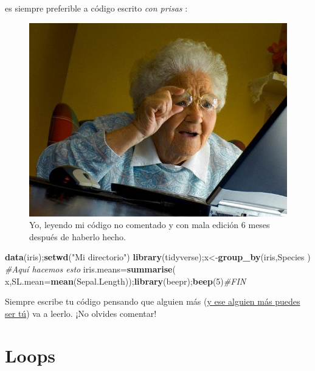 \documentclass[
]{book}
\newenvironment{Shaded}{\begin{snugshade}}{\end{snugshade}}
\newcommand{\CommentTok}[1]{\textcolor[rgb]{0.56,0.35,0.01}{\textit{#1}}}
\newcommand{\DataTypeTok}[1]{\textcolor[rgb]{0.13,0.29,0.53}{#1}}
\newcommand{\DecValTok}[1]{\textcolor[rgb]{0.00,0.00,0.81}{#1}}
\newcommand{\KeywordTok}[1]{\textcolor[rgb]{0.13,0.29,0.53}{\textbf{#1}}}
\newcommand{\NormalTok}[1]{#1}
\newcommand{\StringTok}[1]{\textcolor[rgb]{0.31,0.60,0.02}{#1}}
\begin{document}
es siempre preferible a código escrito \emph{con prisas} :

\begin{figure}

{\centering \includegraphics[width=8.89in]{images/Grandma-Finds-The-Internet} 

}

\caption{Yo, leyendo mi código no comentado y con mala edición 6 meses después de haberlo hecho.}\label{fig:unnamed-chunk-107}
\end{figure}

\begin{Shaded}
\begin{Highlighting}[]
\KeywordTok{data}\NormalTok{(iris);}\KeywordTok{setwd}\NormalTok{(}\StringTok{"Mi directorio"}\NormalTok{)}
\KeywordTok{library}\NormalTok{(tidyverse);x<-}\KeywordTok{group_by}\NormalTok{(iris,Species  )}
\CommentTok{#Aquí hacemos esto}
\NormalTok{iris.means=}\KeywordTok{summarise}\NormalTok{( x,}\DataTypeTok{SL.mean=}\KeywordTok{mean}\NormalTok{(Sepal.Length));}\KeywordTok{library}\NormalTok{(beepr);}\KeywordTok{beep}\NormalTok{(}\DecValTok{5}\NormalTok{)}\CommentTok{#FIN}
\end{Highlighting}
\end{Shaded}

Siempre escribe tu código pensando que alguien más (\href{https://www.redaccionmedica.com/virico/noticias/el-gato-de-schrodinger-y-por-que-no-abrir-la-puerta-cerrada-de-la-consulta-5188}{y ese alguien más puedes ser tú}) va a leerlo. ¡No olvides comentar!

\hypertarget{loops}{%
\section{Loops}\label{loops}}
\end{document}
